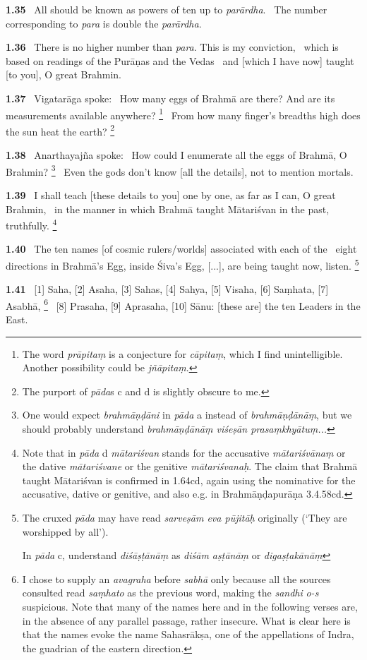 \documentclass{article}
\newcommand{\skt}[1]{\textit{#1}}
\begin{document}
\textbf{1.35}%
\ All should be known as powers of ten up to \skt{parārdha}.%
\ The number corresponding to \skt{para} is double the \skt{parārdha}.%


\textbf{1.36}%
\ There is no higher number than \skt{para}. This is my conviction,%
\ which is based on readings of the Purāṇas and the Vedas%
\                 and [which I have now] taught [to you], O great Brahmin.%


\textbf{1.37}%
\ Vigatarāga spoke:%
\ How many eggs of Brahmā are there? And are its measurements available anywhere?%
\footnote{The word \skt{prāpitaṃ} is a conjecture for \skt{cāpitaṃ}, which I find unintelligible.                 Another possibility could be \skt{jñāpitaṃ}. }%
\ From how many finger's breadths high does the sun heat the earth?%
\footnote{The purport of \skt{pāda}s c and d is slightly obscure to me. }%


\textbf{1.38}%
\ Anarthayajña spoke:%
\ How could I enumerate all the eggs of Brahmā, O Brahmin?%
\footnote{One would expect \skt{brahmāṇḍāni} in \skt{pāda} a instead of \skt{brahmāṇḍānāṃ},                but we should probably understand \skt{brahmāṇḍānāṃ viśeṣān prasaṃkhyātuṃ...} }%
\ Even the gods don't know [all the details], not to mention mortals.%


\textbf{1.39}%
\ I shall teach [these details to you] one by one, as far as I can, O great Brahmin,%
\ in the manner in which Brahmā taught Mātariśvan in the past, truthfully.%
\footnote{Note that in \skt{pāda} d \skt{mātariśvan} stands for the accusative \skt{mātariśvānaṃ} or                        the dative \skt{mātariśvane} or the genitive \skt{mātariśvanaḥ}.                        The claim that Brahmā taught Mātariśvan is confirmed in 1.64cd,                        again using the nominative for the accusative, dative or genitive, and                        also e.g. in Brahmāṇḍapurāṇa 3.4.58cd. }%


\textbf{1.40}%
\ The ten names [of cosmic rulers/worlds] associated with each of the%
\                 eight directions in Brahmā's Egg, inside Śiva's Egg, [...], are being taught now, listen.%
\footnote{The cruxed \skt{pāda} may have read \skt{sarveṣām eva pūjitāḥ} originally                                         (`They are worshipped by all').        

        In \skt{pāda} c, understand \skt{diśāṣṭānāṃ} as \skt{diśām aṣṭānāṃ} or \skt{digaṣṭakānāṃ} }%


\textbf{1.41}%
\ [1] Saha, [2] Asaha, [3] Sahas, [4] Sahya, [5] Visaha, [6] Saṃhata, [7] Asabhā,%
\footnote{I chose to supply an \skt{avagraha} before \skt{sabhā} only because all the sources                 consulted read \skt{saṃhato} as the previous word, making the \skt{sandhi}                \skt{o-s} suspicious.                 Note that many of the names here and in the following verses are,                in the absence of any parallel passage, rather insecure.                What is clear here is that the names evoke the name Sahasrākṣa, one of the appellations of                Indra, the guadrian of the eastern direction. }%
\ [8] Prasaha, [9] Aprasaha, [10] Sānu: [these are] the ten Leaders in the East.%
\end{document}
